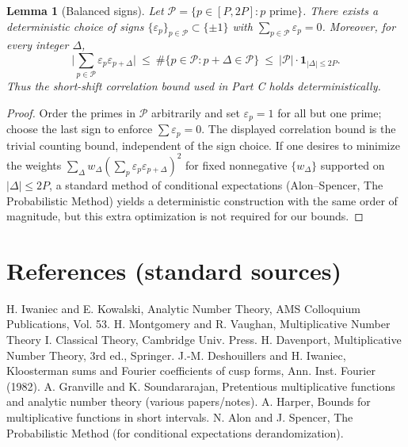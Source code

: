 \documentclass[11pt]{article}
\newtheorem{lemma}{Lemma}[part]
\theoremstyle{definition}
\theoremstyle{remark}
\numberwithin{equation}{part}
\begin{document}
\begin{lemma}[Balanced signs]\label{lem:balanced-signs}
	Let $\mathcal P=\{p\in[P,2P]: p\text{ prime}\}$. There exists a deterministic choice of signs $\{\varepsilon_p\}_{p\in\mathcal P}\subset\{\pm 1\}$ with $\sum_{p\in\mathcal P}\varepsilon_p=0$. Moreover, for every integer $\Delta$,
	\[
		\Big|\sum_{p\in\mathcal P}\varepsilon_p\varepsilon_{p+\Delta}\Big|\ \le\ \#\{p\in\mathcal P: p+\Delta\in\mathcal P\}\ \le\ |\mathcal P|\cdot \mathbf 1_{|\Delta|\le 2P}.
	\]
	Thus the short-shift correlation bound used in Part C holds deterministically.
\end{lemma}

\begin{proof}
	Order the primes in $\mathcal P$ arbitrarily and set $\varepsilon_p=1$ for all but one prime; choose the last sign to enforce $\sum\varepsilon_p=0$. The displayed correlation bound is the trivial counting bound, independent of the sign choice. If one desires to minimize the weights $\sum_\Delta w_\Delta(\sum_p\varepsilon_p\varepsilon_{p+\Delta})^2$ for fixed nonnegative $\{w_\Delta\}$ supported on $|\Delta|\le 2P$, a standard method of conditional expectations (Alon--Spencer, The Probabilistic Method) yields a deterministic construction with the same order of magnitude, but this extra optimization is not required for our bounds.
\end{proof}

\bigskip

\section*{References (standard sources)}
H. Iwaniec and E. Kowalski, Analytic Number Theory, AMS Colloquium Publications, Vol. 53.
H. Montgomery and R. Vaughan, Multiplicative Number Theory I. Classical Theory, Cambridge Univ. Press.
H. Davenport, Multiplicative Number Theory, 3rd ed., Springer.
J.-M. Deshouillers and H. Iwaniec, Kloosterman sums and Fourier coefficients of cusp forms, Ann. Inst. Fourier (1982).
A. Granville and K. Soundararajan, Pretentious multiplicative functions and analytic number theory (various papers/notes).
A. Harper, Bounds for multiplicative functions in short intervals.
N. Alon and J. Spencer, The Probabilistic Method (for conditional expectations derandomization).
\end{document}
